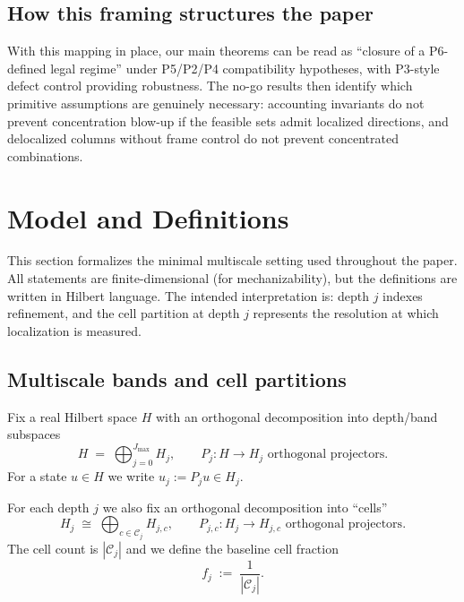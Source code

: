 \documentclass[11pt]{article}
\begin{document}
\subsection{How this framing structures the paper}

With this mapping in place, our main theorems can be read as ``closure of a P6-defined legal regime'' under P5/P2/P4 compatibility hypotheses, with P3-style defect control providing robustness.
The no-go results then identify which primitive assumptions are genuinely necessary: accounting invariants do not prevent concentration blow-up if the feasible sets admit localized directions, and delocalized columns without frame control do not prevent concentrated combinations.
 \section{Model and Definitions}\label{sec:definitions}

This section formalizes the minimal multiscale setting used throughout the paper.
All statements are finite-dimensional (for mechanizability), but the definitions are written in Hilbert language.
The intended interpretation is: depth $j$ indexes refinement, and the cell partition at depth $j$ represents the resolution at which localization is measured.

\subsection{Multiscale bands and cell partitions}

Fix a real Hilbert space $H$ with an orthogonal decomposition into depth/band subspaces
\begin{equation}\label{eq:hilbert-decomp}
H \;=\; \bigoplus_{j=0}^{J_{\max}} H_j,
\qquad
P_j:H\to H_j
\text{ orthogonal projectors}.
\end{equation}
For a state $u\in H$ we write $u_j:=P_j u\in H_j$.

For each depth $j$ we also fix an orthogonal decomposition into ``cells''
\begin{equation}\label{eq:cell-decomp}
H_j \;\cong\; \bigoplus_{c\in \mathcal{C}_j} H_{j,c},
\qquad
P_{j,c}:H_j\to H_{j,c}
\text{ orthogonal projectors}.
\end{equation}
The cell count is $|\mathcal{C}_j|$ and we define the baseline cell fraction
\begin{equation}\label{eq:baseline-fj}
f_j \;:=\; \frac{1}{|\mathcal{C}_j|}.
\end{equation}
\end{document}
